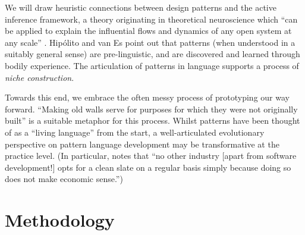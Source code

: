 \documentclass[acmlarge,timestamp]{acmart}
\begin{document}
We will draw heuristic connections between design patterns and the
active inference framework, a theory originating in theoretical
neuroscience which “can be applied to explain the influential flows and
dynamics of any open system at any scale” \cite{Hiplito2022}.
Hip\'olito and van Es point out that patterns (when understood in a
suitably general sense) are pre-linguistic, and are discovered and
learned through bodily experience.  The articulation of patterns in
language supports a process of \emph{niche construction}.

Towards this end, we embrace the often messy process of prototyping
our way forward.  “Making old walls serve for purposes for which they
were not originally built” \cite{descartes1850discourse} is a suitable
metaphor for this process.  Whilst patterns have been thought of as a
“living language” \cite[p.~xvii]{alexander1977a} from the start, a
well-articulated evolutionary perspective on pattern language
development may be transformative at the practice level.  (In
particular, \citet[p.~xxiii]{lowy2019righting} notes that “no other
industry [apart from software development!] opts for a clean slate on
a regular basis simply because doing so does not make economic
sense.”)

\section{Methodology}
\label{sec:org134acbb}
\label{methods}
\end{document}
